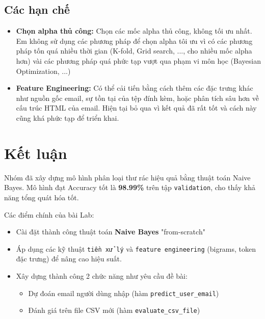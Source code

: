 \subsection{Các hạn chế}
\begin{itemize}
    \item \textbf{Chọn alpha thủ công:} Chọn các mốc alpha thủ công, không tối ưu nhất. Em không sử dụng các phương pháp để chọn alpha tôi ưu vì có các phương pháp tốn quá nhiều thời gian (K-fold, Grid search, ..., cho nhiều mốc alpha hơn) vài các phương pháp quá phức tạp vượt qua phạm vi môn học (Bayesian Optimization, ...)
    \item \textbf{Feature Engineering:} Có thể cải tiến bằng cách thêm các đặc trưng khác như nguồn gốc email, sự tồn tại của tệp đính kèm, hoặc phân tích sâu hơn về cấu trúc HTML của email. Hiện tại bỏ qua vì kết quả đã rất tốt và cách này cũng khá phức tạp để triển khai.
\end{itemize}

\section{Kết luận}
 Nhóm đã xây dựng mô hình phân loại thư rác hiệu quả bằng thuật toán Naive Bayes. Mô hình đạt Accuracy tốt là \textbf{98.99\%} trên tập \texttt{validation}, cho thấy khả năng tổng quát hóa tốt.

Các điểm chính của bài Lab:
\begin{itemize}
    \item Cài đặt thành công thuật toán \textbf{Naive Bayes} "from-scratch"
    \item Áp dụng các kỹ thuật \texttt{tiền xử lý} và \texttt{feature engineering} (bigrams, token đặc trưng) để nâng cao hiệu suất.
    \item Xây dựng thành công 2 chức năng như yêu cầu đề bài:
    \begin{itemize}
        \item Dự đoán email người dùng nhập (hàm \texttt{predict\_user\_email})
        \item Đánh giá trên file CSV mới (hàm \texttt{evaluate\_csv\_file})
    \end{itemize}
\end{itemize}